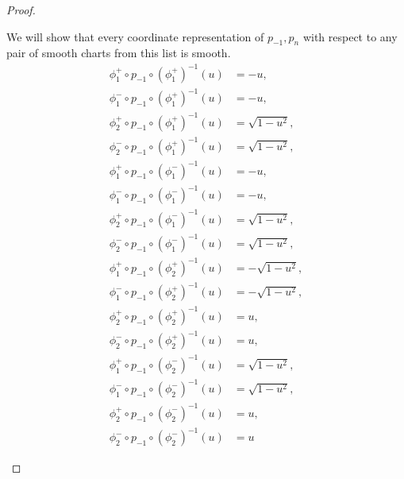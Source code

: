 \begin{proof}
\begin{enumerate}[itemsep=0pt,label={(\alph*)}]
              We will show that every coordinate representation of \( p_{-1}, p_{n} \) with respect to any pair of smooth charts from this list is smooth.
              \begingroup
              \allowdisplaybreaks%
              \begin{align*}
                  \phi_{1}^{+} \circ p_{-1} \circ {\left(\phi_{1}^{+}\right)}^{-1}(u) & = -u,                \\
                  \phi_{1}^{-} \circ p_{-1} \circ {\left(\phi_{1}^{+}\right)}^{-1}(u) & = -u,                \\
                  \phi_{2}^{+} \circ p_{-1} \circ {\left(\phi_{1}^{+}\right)}^{-1}(u) & = \sqrt{1 - u^{2}},  \\
                  \phi_{2}^{-} \circ p_{-1} \circ {\left(\phi_{1}^{+}\right)}^{-1}(u) & = \sqrt{1 - u^{2}},  \\
                  \phi_{1}^{+} \circ p_{-1} \circ {\left(\phi_{1}^{-}\right)}^{-1}(u) & = -u,                \\
                  \phi_{1}^{-} \circ p_{-1} \circ {\left(\phi_{1}^{-}\right)}^{-1}(u) & = -u,                \\
                  \phi_{2}^{+} \circ p_{-1} \circ {\left(\phi_{1}^{-}\right)}^{-1}(u) & = \sqrt{1 - u^{2}},  \\
                  \phi_{2}^{-} \circ p_{-1} \circ {\left(\phi_{1}^{-}\right)}^{-1}(u) & = \sqrt{1 - u^{2}},  \\
                  \phi_{1}^{+} \circ p_{-1} \circ {\left(\phi_{2}^{+}\right)}^{-1}(u) & = -\sqrt{1 - u^{2}}, \\
                  \phi_{1}^{-} \circ p_{-1} \circ {\left(\phi_{2}^{+}\right)}^{-1}(u) & = -\sqrt{1 - u^{2}}, \\
                  \phi_{2}^{+} \circ p_{-1} \circ {\left(\phi_{2}^{+}\right)}^{-1}(u) & = u,                 \\
                  \phi_{2}^{-} \circ p_{-1} \circ {\left(\phi_{2}^{+}\right)}^{-1}(u) & = u,                 \\
                  \phi_{1}^{+} \circ p_{-1} \circ {\left(\phi_{2}^{-}\right)}^{-1}(u) & = \sqrt{1 - u^{2}},  \\
                  \phi_{1}^{-} \circ p_{-1} \circ {\left(\phi_{2}^{-}\right)}^{-1}(u) & = \sqrt{1 - u^{2}},  \\
                  \phi_{2}^{+} \circ p_{-1} \circ {\left(\phi_{2}^{-}\right)}^{-1}(u) & = u,                 \\
                  \phi_{2}^{-} \circ p_{-1} \circ {\left(\phi_{2}^{-}\right)}^{-1}(u) & = u
              \end{align*}
              \endgroup


\end{enumerate}
\end{proof}

